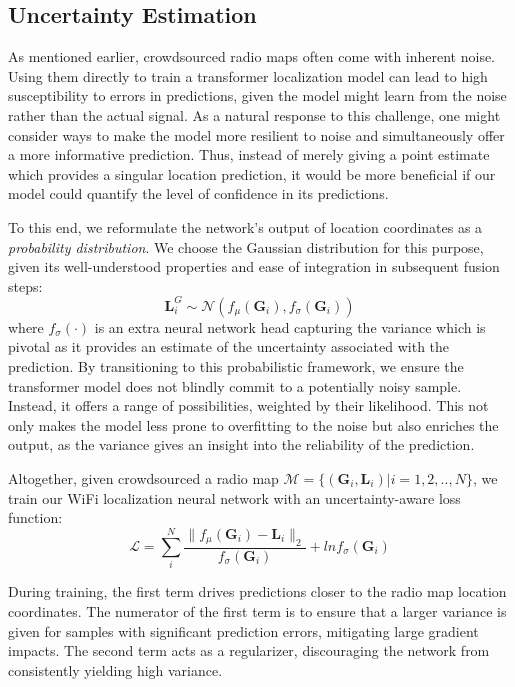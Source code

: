 \subsection{Uncertainty Estimation} 
\label{sub:uncertainty_estimation}
As mentioned earlier, crowdsourced radio maps often come with inherent noise. Using them directly to train a transformer localization model can lead to high susceptibility to errors in predictions, given the model might learn from the noise rather than the actual signal. As a natural response to this challenge, one might consider ways to make the model more resilient to noise and simultaneously offer a more informative prediction. Thus, instead of merely giving a point estimate which provides a singular location prediction, it would be more beneficial if our model could quantify the level of confidence in its predictions. 

To this end, we reformulate the network's output of location coordinates as a \emph{probability distribution}. We choose the Gaussian distribution for this purpose, given its well-understood properties and ease of integration in subsequent fusion steps:
\begin{equation}
\mathbf{L}^{G}_i \sim \mathcal{N}(f_{\mu}(\mathbf{G}_i), f_{\sigma}(\mathbf{G}_i))
\end{equation}
where $f_{\sigma}(\cdot)$ is an extra neural network head capturing the variance which is pivotal as it provides an estimate of the uncertainty associated with the prediction. By transitioning to this probabilistic framework, we ensure the transformer model does not blindly commit to a potentially noisy sample. Instead, it offers a range of possibilities, weighted by their likelihood. This not only makes the model less prone to overfitting to the noise but also enriches the output, as the variance gives an insight into the reliability of the prediction. 

Altogether, given crowdsourced a radio map $\mathcal{M} = \{(\mathbf{G}_i, \mathbf{L}_i)|i=1,2,..,N\}$, we train our WiFi localization neural network with an uncertainty-aware loss function:
\begin{equation}
\mathcal{L} = \sum_{i}^{N} \frac{\lVert f_{\mu}(\mathbf{G}_i) - \mathbf{L}_i \rVert_2}{f_{\sigma}(\mathbf{G}_i)}+ln{f_{\sigma}(\mathbf{G}_i)} 
\end{equation}

During training, the first term drives predictions closer to the radio map location coordinates. The numerator of the first term is to ensure that a larger variance is given for samples with significant prediction errors, mitigating large gradient impacts. The second term acts as a regularizer, discouraging the network from consistently yielding high variance.